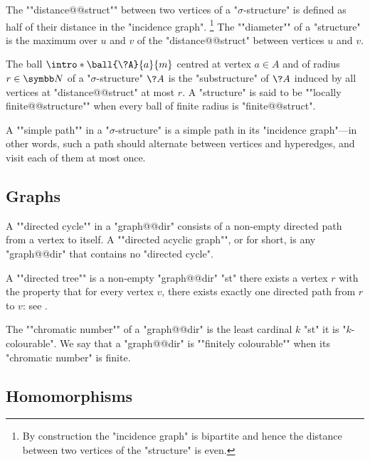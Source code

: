 The \AP""distance@@struct"" between two vertices of a "$\sigma$-structure"
is defined as half of their distance in the "incidence graph".%
\footnote{By construction the "incidence graph" is bipartite and hence
the distance between two vertices of the "structure" is even.}
The \AP""diameter"" of a "structure" is the maximum over $u$ and $v$
of the "distance@@struct" between vertices $u$ and $v$.

The ball \AP$\intro*\ball{\?A}{a}{m}$ centred at vertex $a\in A$ and of radius $r\in\N$ of
a "$\sigma$-structure" $\?A$ is the "substructure" of $\?A$ induced by
all vertices at "distance@@struct" at most $r$.
A "structure" is said to be \AP""locally finite@@structure""
when every ball of finite radius is "finite@@struct".

A \AP""simple path"" in a "$\sigma$-structure" is a
simple path in its "incidence graph"---in other words, 
such a path should alternate between vertices and hyperedges,
and visit each of them at most once.

\subsection{Graphs}

A \AP""directed cycle"" in a "graph@@dir" consists
of a non-empty directed path from a vertex to itself.
A ""directed acyclic graph"", or  for short,
is any "graph@@dir" that contains no "directed cycle".

\begin{marginfigure}
	\centering
	\begin{tikzpicture}
		
	\end{tikzpicture}
	\caption{\AP \label{fig:general-prelim-directed-tree} A "directed tree".}
\end{marginfigure}
A ""directed tree"" is a non-empty "graph@@dir" "st" there exists 
a vertex $r$ with the property that for every vertex $v$,
there exists exactly one directed path from $r$ to $v$:
see .

The ""chromatic number"" of a "graph@@dir" is the least cardinal $k$
"st" it is "$k$-colourable". We say that a "graph@@dir"
is \AP""finitely colourable"" when its "chromatic number" is finite.


\subsection{Homomorphisms}

